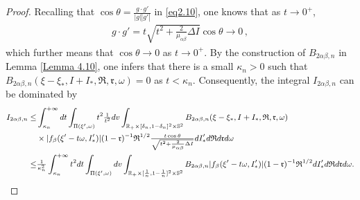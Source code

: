 \documentclass[reqno,11pt]{amsart}
\numberwithin{equation}{section}
\def\R{\mathbb{R}}
\begin{document}
\begin{proof}
Recalling that $\cos \theta = \tfrac{g \cdot g'}{ |g| |g'| }$ in \eqref{eq2.10}, one knows that as $t \to 0^+$,
\begin{equation*}
  \begin{aligned}
    g \cdot g' = t \sqrt{t^2 + \tfrac{2}{ \mu_{ \alpha \beta } } \Delta I } \cos \theta \to 0 \,,
  \end{aligned}
\end{equation*}
which further means that $\cos \theta \to 0$ as $t \to 0^+$. By the construction of $B_{2 \alpha \beta, n}$ in Lemma \ref{Lemma 4.10}, one infers that there is a small $\kappa_n > 0$ such that $ B_{2 \alpha \beta, n} (\xi-\xi_*,I+I_*,\mathfrak{R},\mathfrak{r},\omega ) = 0 $ as $t < \kappa_n$. Consequently, the integral $I_{2 \alpha \beta, n}$ can be dominated by
\begin{equation*}{\small
\begin{aligned}
I_{2 \alpha \beta, n} \leq & \int_{\kappa_n}^{+\infty} dt \int_{\Pi (\xi' ,\omega )} t^2 \tfrac{1}{t^2} dv \int_{\R_+ \times [\delta_n,1-\delta_n]^2 \times \mathbb{S}^2 } B_{2\alpha \beta ,n} (\xi-\xi_*,I+I_*,\mathfrak{R},\mathfrak{r},\omega ) \\
& \times | f_{\beta }(\xi'-t\omega ,I'_*) | (1-\mathfrak{r})^{-1}\mathfrak{R}^{1/2} \tfrac{t \cos \theta }{\sqrt{t^2+\frac{2}{\mu_{\alpha \beta }}\Delta I }}dI'_* d\mathfrak{R}d\mathfrak{r}d\omega\\
\leq & \tfrac{1}{\kappa_n^2} \int_{\kappa_n }^{+\infty} t^2 dt \int_{\Pi (\xi' ,\omega )}  dv \int_{\R_+ \times [\frac{1}{n},1-\frac{1}{n}]^2 \times \mathbb{S}^2 } B_{2\alpha \beta ,n} | f_{\beta }(\xi'-t\omega ,I'_*) | (1-\mathfrak{r})^{-1}\mathfrak{R}^{1/2} dI'_* d\mathfrak{R}d\mathfrak{r}d\omega.
\end{aligned}}
\end{equation*}	


\end{proof}
\end{document}
